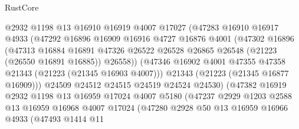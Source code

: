 \begin{lexlean}{RustCore}
\begin{coremodule}
                        @2932
                        @1198
                        @13
                        @16910
                        @16919
                        @4007
                        @17027
                        (@47283
                          @16910
                          @16917
                          @4933
                          (@47292
                            @16896
                            @16909
                            @16916
                            @4727
                            @16876
                            @4001
                            (@47302
                              @16896
                              (@47313
                                @16884
                                @16891
                                @47326
                                @26522
                                @26528
                                @26865
                                @26548
                                (@21223 (@26550 @16891 @16885))
                                @26558))
                            (@47346
                              @16902
                              @4001
                              @47355
                              @47358
                              @21343
                              (@21223 (@21345 @16903 @4007)))
                            @21343
                            (@21223 (@21345 @16877 @16909)))
                          @24509
                          @24512
                          @24515
                          @24519
                          @24524
                          @24530)
                        (@47382
                          @16919
                          @2932
                          @1198
                          @13
                          @16959
                          @17024
                          @4007
                          @5180
                          (@47237
                            @2929
                            @1203
                            @2588
                            @13
                            @16959
                            @16968
                            @4007
                            @17024
                            (@47280
                              @2928
                              @50
                              @13
                              @16959
                              @16966
                              @4933
                              (@47493
                                @1414
                                @11

\end{coremodule}
\end{lexlean}
